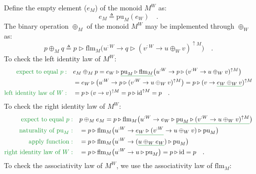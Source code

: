 Define the empty element ($e_{M}$) of the monoid $M^{W}$ as:
\[
e_{M}\triangleq\text{pu}_{M}(e_{W})\quad.
\]
The binary operation $\oplus_{M}$ of the monoid $M^{W}$ may be implemented
through $\oplus_{W}$ as:
\[
p\oplus_{M}q\triangleq p\triangleright\text{flm}_{M}\big(u^{:W}\rightarrow q\triangleright(v^{:W}\rightarrow u\oplus_{W}v)^{\uparrow M}\big)\quad.
\]
To check the left identity law of $M^{W}$:
\begin{align*}
{\color{greenunder}\text{expect to equal }p:}\quad & e_{M}\oplus_{M}p=e_{W}\triangleright\gunderline{\text{pu}_{M}\triangleright\text{flm}_{M}}\big(u^{:W}\rightarrow p\triangleright(v^{:W}\rightarrow u\oplus_{W}v)^{\uparrow M}\big)\\
 & =e_{W}\triangleright\big(u^{:W}\rightarrow p\triangleright(v^{:W}\rightarrow u\oplus_{W}v)^{\uparrow M}\big)=p\triangleright(v\rightarrow\gunderline{e_{W}\oplus_{W}v})^{\uparrow M}\\
{\color{greenunder}\text{left identity law of }W:}\quad & =p\triangleright(v\rightarrow v)^{\uparrow M}=p\triangleright\text{id}^{\uparrow M}=p\quad.
\end{align*}
To check the right identity law of $M^{W}$:
\begin{align*}
{\color{greenunder}\text{expect to equal }p:}\quad & p\oplus_{M}e_{M}=p\triangleright\text{flm}_{M}\big(u^{:W}\rightarrow e_{W}\triangleright\gunderline{\text{pu}_{M}\triangleright(v^{:W}\rightarrow u\oplus_{W}v)^{\uparrow M}}\big)\\
{\color{greenunder}\text{naturality of }\text{pu}_{M}:}\quad & =p\triangleright\text{flm}_{M}\big(u^{:W}\rightarrow\gunderline{e_{W}\triangleright(v^{:W}}\rightarrow u\oplus_{W}v)\triangleright\text{pu}_{M}\big)\\
{\color{greenunder}\text{apply function}:}\quad & =p\triangleright\text{flm}_{M}\big(u^{:W}\rightarrow(\gunderline{u\oplus_{W}e_{W}})\triangleright\text{pu}_{M}\big)\\
{\color{greenunder}\text{right identity law of }W:}\quad & =p\triangleright\text{flm}_{M}\big(u^{:W}\rightarrow u\triangleright\text{pu}_{M}\big)=p\triangleright\text{id}=p\quad.
\end{align*}
To check the associativity law of $M^{W}$, we use the associativity
law of $\text{flm}_{M}$:
